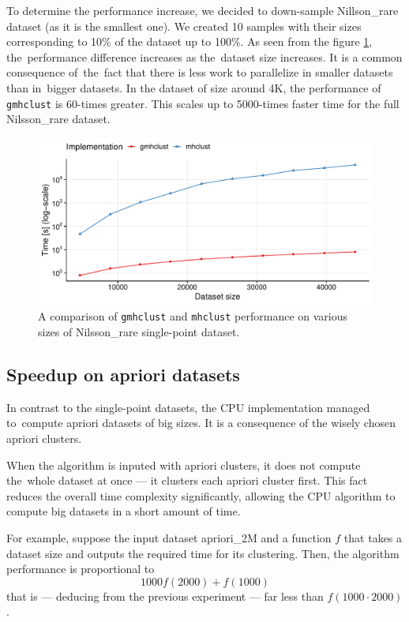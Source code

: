 To determine the performance increase, we decided to down-sample Nillson\_rare dataset (as it is the smallest one). We created 10 samples with their sizes corresponding to 10\% of the dataset up to 100\%.
As seen from the figure \ref{fig04:single_perf}, the~performance difference increases as the~dataset size increases. It is a common consequence of~the~fact that there is less work to parallelize in smaller datasets than in~bigger datasets. In the dataset of size around 4K, the performance of \texttt{gmhclust} is 60-times greater. This scales up to 5000-times faster time for the full Nilsson\_rare dataset.

\begin{figure}\centering
	\includegraphics[width=\linewidth]{img/single_perf_comp}
	\caption{A comparison of \texttt{gmhclust} and \texttt{mhclust} performance on various sizes of Nilsson\_rare single-point dataset.}
	\label{fig04:single_perf}
\end{figure}

\subsection{Speedup on apriori datasets}
\label{sec04:apr_perf}

In contrast to the single-point datasets, the CPU implementation managed to~compute apriori datasets of big sizes. It is a consequence of the wisely chosen apriori clusters.

When the algorithm is inputed with apriori clusters, it does not compute the~whole dataset at once --- it clusters each apriori cluster first. This fact reduces the overall time complexity significantly, allowing the CPU algorithm to compute big datasets in a short amount of time.

For example, suppose the input dataset apriori\_2M and a function $f$ that takes a dataset size and outputs the required time for its clustering. Then, the algorithm performance is proportional to $$1000f(2000)+f(1000)$$ that is --- deducing from the previous experiment --- far less than $f(1000\cdot 2000)$.

